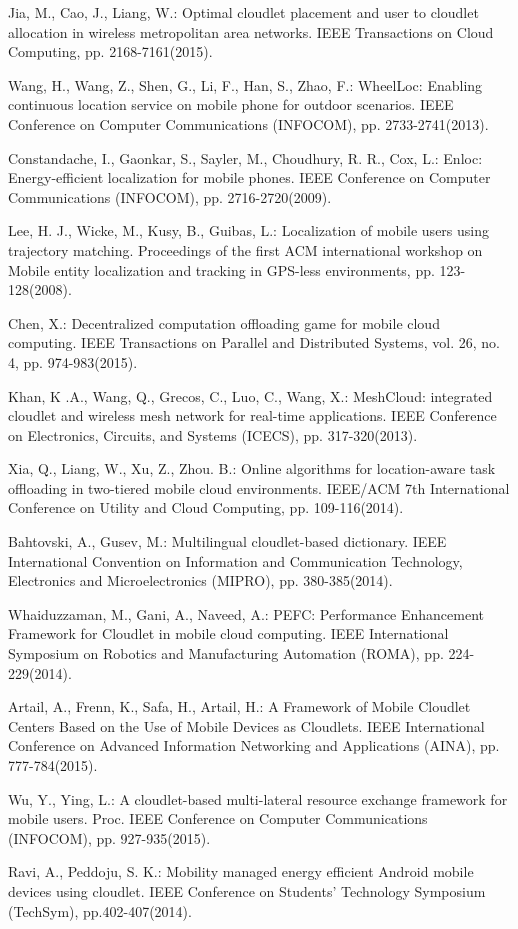\documentclass{llncs}
\begin{document}
\begin{thebibliography}{99}
Jia, M., Cao, J., Liang, W.:
Optimal cloudlet placement and user to cloudlet allocation in wireless metropolitan area networks.
IEEE Transactions on Cloud Computing, pp. 2168-7161(2015).

Wang, H., Wang, Z., Shen, G., Li, F., Han, S., Zhao, F.:
WheelLoc: Enabling continuous location service on mobile phone for outdoor scenarios.
IEEE Conference on Computer Communications (INFOCOM), pp. 2733-2741(2013).

Constandache, I., Gaonkar, S., Sayler, M., Choudhury, R. R., Cox, L.:
Enloc: Energy-efficient localization for mobile phones.
IEEE Conference on Computer Communications (INFOCOM), pp. 2716-2720(2009).

Lee, H. J., Wicke, M., Kusy, B., Guibas, L.:
Localization of mobile users using trajectory matching.
Proceedings of the first ACM international workshop on Mobile entity localization and tracking in GPS-less environments, pp. 123-128(2008).

Chen, X.:
Decentralized computation offloading game for mobile cloud computing.
IEEE Transactions on Parallel and Distributed Systems, vol. 26, no. 4, pp. 974-983(2015).

Khan, K .A., Wang, Q., Grecos, C., Luo, C., Wang, X.:
MeshCloud: integrated cloudlet and wireless mesh network for real-time applications.
IEEE Conference on Electronics, Circuits, and Systems (ICECS), pp. 317-320(2013).

Xia, Q., Liang, W., Xu, Z., Zhou. B.:
Online algorithms for location-aware task offloading in two-tiered mobile cloud environments.
IEEE/ACM 7th International Conference on Utility and Cloud Computing, pp. 109-116(2014).

Bahtovski, A., Gusev, M.:
Multilingual cloudlet-based dictionary.
IEEE International Convention on Information and Communication Technology, Electronics and Microelectronics (MIPRO), pp. 380-385(2014).

Whaiduzzaman, M., Gani, A., Naveed, A.:
PEFC: Performance Enhancement Framework for Cloudlet in mobile cloud computing.
IEEE International Symposium on Robotics and Manufacturing Automation (ROMA), pp. 224-229(2014).

Artail, A., Frenn, K., Safa, H., Artail, H.:
A Framework of Mobile Cloudlet Centers Based on the Use of Mobile Devices as Cloudlets.
IEEE International Conference on Advanced Information Networking and Applications (AINA), pp. 777-784(2015).

Wu, Y., Ying, L.:
A cloudlet-based multi-lateral resource exchange framework for mobile users.
Proc. IEEE Conference on Computer Communications (INFOCOM), pp. 927-935(2015).

Ravi, A., Peddoju, S. K.:
Mobility managed energy efficient Android mobile devices using cloudlet.
IEEE Conference on Students' Technology Symposium (TechSym), pp.402-407(2014).

\end{thebibliography}
\end{document}
